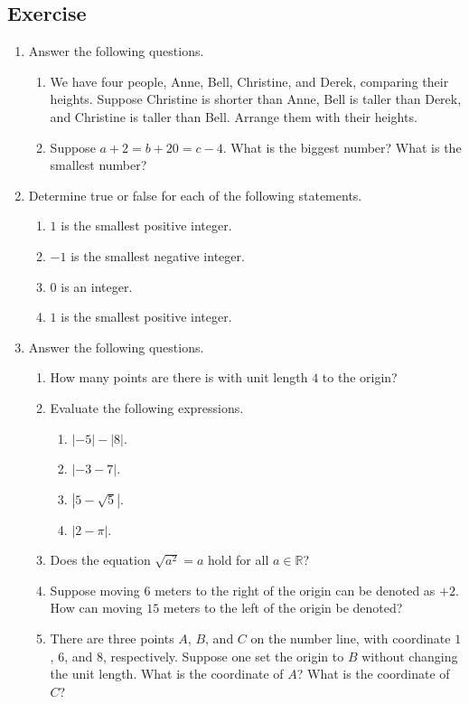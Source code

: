 \documentclass[11pt]{book}
\theoremstyle{break}
\theoremstyle{no_label}
\newcommand{\bbR}{\mathbb{R}}
\numberwithin{equation}{section}
\begin{document}
\subsection*{Exercise}
\begin{enumerate}[label=\arabic*.]
    \item Answer the following questions.
    \begin{enumerate}
        \item We have four people, Anne, Bell, Christine, and Derek, comparing their heights. Suppose Christine is shorter than Anne, Bell is taller than Derek, and Christine is taller than Bell. Arrange them with their heights.
        \item Suppose $a+2=b+20=c-4$. What is the biggest number? What is the smallest number?
    \end{enumerate}
    \item Determine true or false for each of the following statements.
    \begin{enumerate}
        \item $1$ is the smallest positive integer.
        \item $-1$ is the smallest negative integer.
        \item $0$ is an integer.
        \item $1$ is the smallest positive integer.
    \end{enumerate}
    \item Answer the following questions.
    \begin{enumerate}
        \item How many points are there is with unit length $4$ to the origin?
        \item Evaluate the following expressions.
        \begin{enumerate}[label=\alph*.]
            \item $|-5|-|8|$.
            \item $|-3-7|$.
            \item $|5-\sqrt{5}|$.
            \item $|2-\pi|$.
        \end{enumerate}
        \item Does the equation $\sqrt{a^2}=a$ hold for all $a\in\bbR$?
        \item Suppose moving $6$ meters to the right of the origin can be denoted as $+2$. How can moving $15$ meters to the left of the origin be denoted?
        \item There are three points $A$, $B$, and $C$ on the number line, with coordinate $1$, $6$, and $8$, respectively. Suppose one set the origin to $B$ without changing the unit length. What is the coordinate of $A$? What is the coordinate of $C$?

\end{enumerate}
\end{enumerate}
\end{document}
